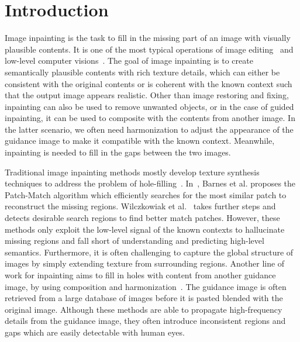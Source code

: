 \documentclass[runningheads]{llncs}
\begin{document}
\section{Introduction}
Image inpainting is the task to fill in the missing part of an image with visually plausible contents. It is one of the most typical operations of image editing~\cite{gatys2015texture} and low-level computer visions~\cite{komodakis2006image,hays2007scene}. The goal of image inpainting is to create semantically plausible contents with rich texture details, which can either be consistent with the original contents or is coherent with the known context such that the output image appears realistic. Other than image restoring and fixing, inpainting can also be used to remove unwanted objects, or in the case of guided inpainting, it can be used to composite with the contents from another image. In the latter scenario, we often need harmonization to adjust the appearance of the guidance image to make it compatible with the known context. Meanwhile, inpainting is needed to fill in the gaps between the two images.    

Traditional image inpainting methods mostly develop texture synthesis techniques to address the problem of hole-filling~\cite{bertalmio2000image,komodakis2006image,wexler2004space,barnes2009patchmatch,bertalmio2003simultaneous,wilczkowiak2005hole}. In~\cite{barnes2009patchmatch}, Barnes et al. proposes the Patch-Match algorithm which efficiently searches for the most similar patch to reconstruct the missing regions. Wilczkowiak et al.~\cite{wilczkowiak2005hole} takes further steps and detects desirable search regions to find better match patches. However, these methods only exploit the low-level signal of the known contexts to hallucinate missing regions and fall short of understanding and predicting high-level semantics. Furthermore, it is often challenging to capture the global structure of images by simply extending texture from surrounding regions. Another line of work for inpainting aims to fill in holes with content from another guidance image, by using composition and harmonization~\cite{hays2007scene,tsai2017deep}. The guidance image is often retrieved from a large database of images before it is pasted blended with the original image. Although these methods are able to propagate high-frequency details from the guidance image, they often introduce inconsistent regions and gaps which are easily detectable with human eyes.  
\end{document}
